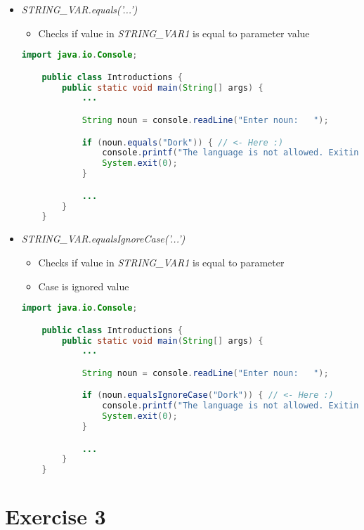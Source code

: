 \documentclass[12pt]{article}
\begin{document}
\bigskip

\begin{itemize}
    \item \textit{STRING\_VAR.equals('...')}
    \begin{itemize}
        \item Checks if value in \textit{STRING\_VAR1} is equal to parameter
        value
    \end{itemize}
    \begin{lstlisting}[language=Java]
    import java.io.Console;

    public class Introductions {
        public static void main(String[] args) {
            ...

            String noun = console.readLine("Enter noun:   ");

            if (noun.equals("Dork")) { // <- Here :)
                console.printf("The language is not allowed. Exiting\n");
                System.exit(0);
            }

            ...
        }
    }
    \end{lstlisting}
    \item \textit{STRING\_VAR.equalsIgnoreCase('...')}
    \begin{itemize}
        \item Checks if value in \textit{STRING\_VAR1} is equal to parameter
        \item Case is ignored
        value
    \end{itemize}

    \bigskip

    \begin{lstlisting}[language=Java]
    import java.io.Console;

    public class Introductions {
        public static void main(String[] args) {
            ...

            String noun = console.readLine("Enter noun:   ");

            if (noun.equalsIgnoreCase("Dork")) { // <- Here :)
                console.printf("The language is not allowed. Exiting\n");
                System.exit(0);
            }

            ...
        }
    }
    \end{lstlisting}
\end{itemize}

\bigskip

\section{Exercise 3}
\end{document}
